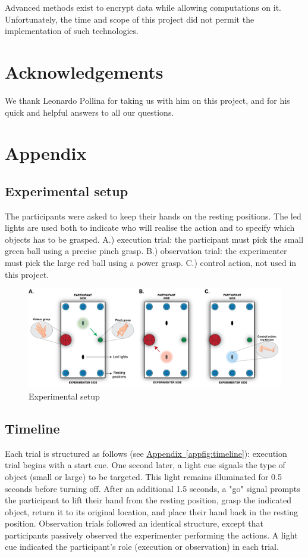 \documentclass[10pt,conference,compsocconf]{IEEEtran}
\newcommand{\aref}[1]{\hyperref[#1]{Appendix~\ref*{#1}}}
\begin{document}
Advanced methods exist to encrypt data while allowing computations on it\cite{app11167360}. Unfortunately, the time and scope of this project did not permit the implementation of such technologies.


\section*{Acknowledgements}
We thank Leonardo Pollina for taking us with him on this project, and for his quick and helpful answers to all our questions.

\newpage

\section{Appendix}
\subsection{Experimental setup}
The participants were asked to keep their hands on the resting positions. The led lights are used both to indicate who will realise the action and to specify which objects has to be grasped. A.) execution trial: the participant must pick the small green ball using a precise pinch grasp. B.) observation trial: the experimenter must pick the large red ball using a power grasp. C.) control action, not used in this project.

\begin{figure}[h!]
    \center
    \includegraphics[width=\linewidth]{images/2024-12-11-13-41-23.png}
    \caption{Experimental setup}
\end{figure}
\FloatBarrier

\subsection{Timeline}
\label{subsec:timeline}
Each trial is structured as follows (see \aref{appfig:timeline}): execution trial begins with a start cue. One second later, a light cue signals the type of object (small or large) to be targeted. This light remains illuminated for 0.5 seconds before turning off. After an additional 1.5 seconds, a "go" signal prompts the participant to lift their hand from the resting position, grasp the indicated object, return it to its original location, and place their hand back in the resting position. Observation trials followed an identical structure, except that participants passively observed the experimenter performing the actions. A light cue indicated the participant's role (execution or observation) in each trial.
\end{document}
